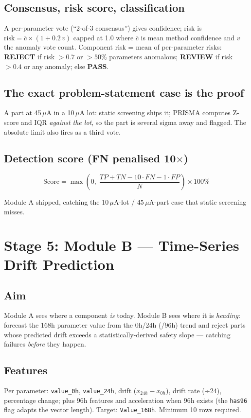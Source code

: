 \documentclass[11pt,a4paper]{article}
\newcommand{\code}[1]{\texttt{\small #1}}
\newcommand{\keys}[1]{\textbf{\sffamily#1}}
\newcommand{\milestone}[1]{\par\vspace{0.6em}\noindent
  \begin{tcolorbox}[colback=solgreen!8,colframe=solgreen,
    title={\sffamily\bfseries\color{white}Milestone},arc=2pt,boxrule=1pt]
    #1
  \end{tcolorbox}\par\vspace{0.4em}}
\begin{document}
\subsection*{Consensus, risk score, classification}
A per-parameter vote (``2-of-3 consensus'') gives confidence; risk is
$\text{risk}=\bar{c}\times(1+0.2\,v)$ capped at 1.0 where $\bar{c}$ is mean method confidence and
$v$ the anomaly vote count. Component risk = mean of per-parameter risks:
\keys{REJECT} if risk $>0.7$ or $>50\%$ parameters anomalous; \keys{REVIEW} if risk $>0.4$ or any
anomaly; else \keys{PASS}.

\subsection*{The exact problem-statement case is the proof}
A part at 45\,$\mu$A in a 10\,$\mu$A lot: static screening ships it; PRISMA computes Z-score and
IQR \emph{against the lot}, so the part is several sigma away and flagged. The absolute limit also
fires as a third vote.

\subsection*{Detection score (FN penalised 10$\times$)}
\[
\text{Score}=\max\!\left(0,\;\frac{TP+TN-10\cdot FN-1\cdot FP}{N}\right)\times100\%
\]

\milestone{Module A shipped, catching the 10\,$\mu$A-lot / 45\,$\mu$A-part case that static
  screening misses.}

\section{Stage 5: Module B --- Time-Series Drift Prediction}

\subsection*{Aim}
Module A sees where a component \emph{is} today. Module B sees where it is \emph{heading}: forecast
the 168h parameter value from the 0h/24h (/96h) trend and reject parts whose predicted drift
exceeds a statistically-derived safety slope --- catching failures \emph{before} they happen.

\subsection*{Features}
Per parameter: \code{value\_0h}, \code{value\_24h}, drift ($x_{24h}-x_{0h}$), drift rate
($\div 24$), percentage change; plus 96h features and acceleration when 96h exists (the
\code{has96} flag adapts the vector length). Target: \code{Value\_168h}. Minimum 10 rows required.
\end{document}
